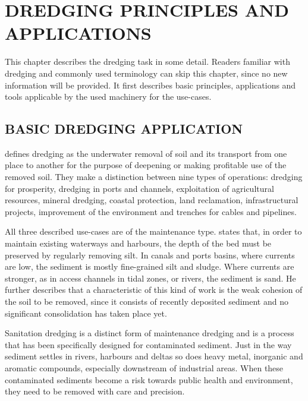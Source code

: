 

\chapter{DREDGING PRINCIPLES AND APPLICATIONS}\label{chap:dredgingprocess}
This chapter describes the dredging task in some detail. Readers familiar with dredging and commonly used terminology
can skip this chapter, since no new information will be provided. It first describes basic principles, applications and
tools applicable by the used machinery for the use-cases.


\section{BASIC DREDGING APPLICATION}\label{sec:basic dredging applications}
\citet{training_institute_for_dredging_ingewijden_2008} defines dredging as the underwater removal of soil and its
transport from one place to another for the purpose of deepening or making profitable use of the removed soil. They make
a distinction between nine types of operations: dredging for prosperity, dredging in ports and channels, exploitation of
agricultural resources, mineral dredging, coastal protection, land reclamation, infrastructural projects, improvement of
the environment and trenches for cables and pipelines.

All three described use-cases are of the maintenance type. \citet{van_der_schrieck_dredging_2014} states that, in order
to maintain existing waterways and harbours, the depth of the bed must be preserved by regularly removing silt. In
canals and ports basins, where currents are low, the sediment is mostly fine-grained silt and sludge. Where currents are
stronger, as in access channels in tidal zones, or rivers, the sediment is sand. He further describes that a
characteristic of this kind of work is the weak cohesion of the soil to be removed, since it consists of recently
deposited sediment and no significant consolidation has taken place yet.

Sanitation dredging is a distinct form of maintenance dredging and is a process that has been specifically designed for
contaminated sediment. Just in the way sediment settles in rivers, harbours and deltas so does heavy metal, inorganic
and aromatic compounds, especially downstream of industrial areas. When these contaminated sediments become a risk
towards public health and environment, they need to be removed with care and precision.


